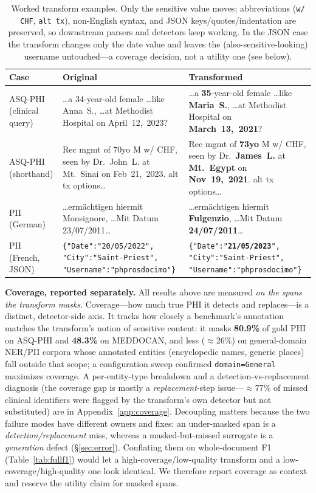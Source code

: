 \documentclass[11pt]{article}
\newcommand{\oldv}[1]{\textcolor{cclay}{#1}}
\newcommand{\newv}[1]{\textcolor{caccent}{\textbf{#1}}}
\newcommand{\tp}[1]{\texttt{#1}}
\begin{document}
\begin{table}[t]\centering\small
\begin{tabular}{p{2.3cm}p{6.0cm}p{6.0cm}}
\toprule
Case & Original & Transformed\\
\midrule
ASQ-PHI (clinical query) & \dots a \oldv{34}-year-old female \dots like \oldv{Anna~S.}, \dots at Methodist Hospital on \oldv{April~12,~2023}? & \dots a \newv{35}-year-old female \dots like \newv{Maria~S.}, \dots at Methodist Hospital on \newv{March~13,~2021}?\\
\addlinespace
ASQ-PHI (shorthand) & Rec mgmt of \oldv{70yo} M w/ CHF, seen by Dr.~\oldv{John~L.} at \oldv{Mt.~Sinai} on \oldv{Feb~21,~2023}. alt tx options\dots & Rec mgmt of \newv{73yo} M w/ CHF, seen by Dr.~\newv{James~L.} at \newv{Mt.~Egypt} on \newv{Nov~19,~2021}. alt tx options\dots\\
\addlinespace
PII (German) & \dots erm\"achtigen hiermit \oldv{Monsignore}, \dots Mit Datum \oldv{23/07/2011}\dots & \dots erm\"achtigen hiermit \newv{Fulgenzio}, \dots Mit Datum \newv{24/07/2011}\dots\\
\addlinespace
PII (French, JSON) & \tp{\{"Date":"\oldv{20/05/2022}", "City":"Saint-Priest", "Username":"phprosdocimo"\}} & \tp{\{"Date":"\newv{21/05/2023}", "City":"Saint-Priest", "Username":"phprosdocimo"\}}\\
\bottomrule
\end{tabular}
\caption{Worked transform examples. Only the sensitive value moves; abbreviations (\tp{w/ CHF}, \tp{alt tx}), non-English syntax, and JSON keys/quotes/indentation are preserved, so downstream parsers and detectors keep working. In the JSON case the transform changes only the date value and leaves the (also-sensitive-looking) username untouched---a coverage decision, not a utility one (see below).}\label{tab:examples}
\end{table}

\textbf{Coverage, reported separately.} All results above are measured \emph{on the spans the transform masks}. Coverage---how much true PHI it detects and replaces---is a distinct, detector-side axis. It tracks how closely a benchmark's annotation matches the transform's notion of sensitive content: it masks \textbf{80.9\%} of gold PHI on ASQ-PHI and \textbf{48.3\%} on MEDDOCAN, and less ($\approx$26\%) on general-domain NER/PII corpora whose annotated entities (encyclopedic names, generic places) fall outside that scope; a configuration sweep confirmed \tp{domain=General} maximizes coverage. A per-entity-type breakdown and a detection-vs-replacement diagnosis (the coverage gap is mostly a \emph{replacement}-step issue---$\approx$77\% of missed clinical identifiers were flagged by the transform's own detector but not substituted) are in Appendix~\ref{app:coverage}. Decoupling matters because the two failure modes have different owners and fixes: an under-masked span is a \emph{detection/replacement} miss, whereas a masked-but-missed surrogate is a \emph{generation} defect (§\ref{sec:error}). Conflating them on whole-document F1 (Table~\ref{tab:fullf1}) would let a high-coverage/low-quality transform and a low-coverage/high-quality one look identical. We therefore report coverage as context and reserve the utility claim for masked spans.
\end{document}
